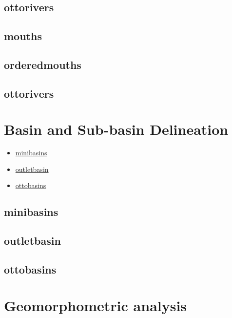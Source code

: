 \documentclass[
]{book}
\providecommand{\tightlist}{%
  \setlength{\itemsep}{0pt}\setlength{\parskip}{0pt}}
\theoremstyle{definition}
\theoremstyle{definition}
\theoremstyle{definition}
\theoremstyle{definition}
\theoremstyle{remark}
\begin{document}
\subsection{ottorivers}\label{ottorivers}

\subsection{mouths}\label{mouths}

\subsection{orderedmouths}\label{orderedmouths}

\subsection{ottorivers}\label{ottorivers}

\section{Basin and Sub-basin Delineation}\label{Basin-and-Sub-basin-Delineation}

\begin{itemize}
\tightlist
\item
  \hyperref[minibasins]{minibasins}\\
\item
  \hyperref[outletbasin]{outletbasin}\\
\item
  \hyperref[ottobasins]{ottobasins}
\end{itemize}

\subsection{minibasins}\label{minibasins}

\subsection{outletbasin}\label{outletbasin}

\subsection{ottobasins}\label{ottobasins}

\section{Geomorphometric analysis}\label{Geomorphometric-analysis}
\end{document}
